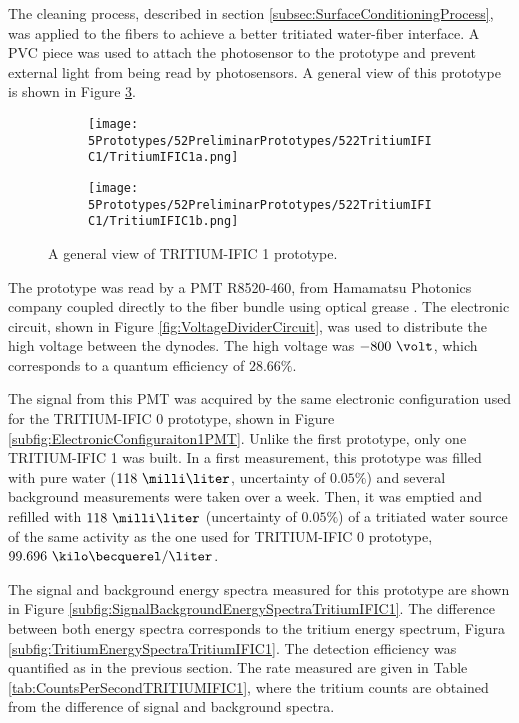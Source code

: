 The cleaning process, described in section \ref{subsec:SurfaceConditioningProcess}, was applied to the fibers to achieve a better tritiated water-fiber interface. A PVC piece was used to attach the photosensor to the prototype and prevent external light from being read by photosensors. A general view of this prototype is shown in Figure \ref{fig:TritumIFIC1}.

\begin{figure}
\centering
    \begin{subfigure}[b]{0.40\textwidth}
    \centering
    \texttt{[image: 5Prototypes/52PreliminarPrototypes/522TritiumIFIC1/TritiumIFIC1a.png]}  
    \caption{\label{subfig:TritumIFIC1a}}
    \end{subfigure}
    \hfill
    \begin{subfigure}[b]{0.40\textwidth}
    \centering
    \texttt{[image: 5Prototypes/52PreliminarPrototypes/522TritiumIFIC1/TritiumIFIC1b.png]}  
    \caption{\label{subfig:TritumIFIC1b}}
    \end{subfigure}
 \caption{A general view of TRITIUM-IFIC 1 prototype.}
 \label{fig:TritumIFIC1}
\end{figure}

The prototype was read by a PMT R8520-460, from Hamamatsu Photonics company \cite{DataSheetPMTs} coupled directly to the fiber bundle using optical grease \cite{OpticalGrease}. The electronic circuit, shown in Figure \ref{fig:VoltageDividerCircuit}, was used to distribute the high voltage between the dynodes. The high voltage was $-800~\volt$, which corresponds to a quantum efficiency of $28.66\%$.

The signal from this PMT was acquired by the same electronic configuration used for the TRITIUM-IFIC 0 prototype, shown in Figure \ref{subfig:ElectronicConfiguraiton1PMT}. Unlike the first prototype, only one TRITIUM-IFIC 1 was built. In a first measurement, this prototype was filled with pure water ($118~\milli\liter$, uncertainty of $0.05\%$) and several background measurements were taken over a week. Then, it was emptied and refilled with $118~\milli\liter$ (uncertainty of $0.05\%$) of a tritiated water source of the same activity as the one used for TRITIUM-IFIC 0 prototype, $99.696~\kilo\becquerel/\liter$. 

The signal and background energy spectra measured for this prototype are shown in Figure \ref{subfig:SignalBackgroundEnergySpectraTritiumIFIC1}. The difference between both energy spectra corresponds to the tritium energy spectrum, Figura \ref{subfig:TritiumEnergySpectraTritiumIFIC1}. The detection efficiency was quantified as in the previous section. The rate measured are given in Table \ref{tab:CountsPerSecondTRITIUMIFIC1}, where the tritium counts are obtained from the difference of signal and background spectra.

